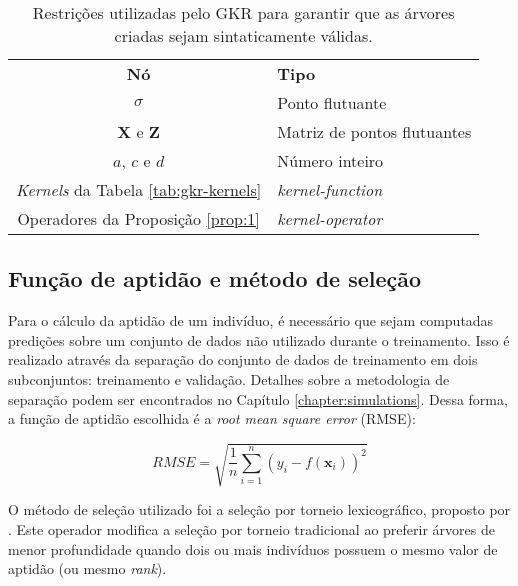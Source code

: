 \begin{table}[H]
    \caption{Restrições utilizadas pelo GKR para garantir que as árvores criadas sejam sintaticamente válidas.}
    \begin{center} \label{tab:stgp-constraints}
        \begin{tabular}{C@{\hskip 15pt}l}
            \hline\noalign{\smallskip}
            \textbf{Nó} & \textbf{Tipo} \\
            \noalign{\smallskip}
            \hline
            \noalign{\smallskip}
            $\sigma$ & Ponto flutuante \\
            $\mathbf{X}$ e $\mathbf{Z}$ & Matriz de pontos flutuantes \\
            $a$, $c$ e $d$ & Número inteiro \\
            \textit{Kernels} da Tabela \ref{tab:gkr-kernels} & \textit{kernel-function} \\
            Operadores da Proposição \ref{prop:1} & \textit{kernel-operator} \\
            \hline
        \end{tabular}
    \end{center}
    \begin{center}
    \end{center}
\end{table}

\subsection{Função de aptidão e método de seleção}
Para o cálculo da aptidão de um indivíduo, é necessário que sejam computadas predições sobre um conjunto de dados não utilizado durante o treinamento. Isso é realizado através da separação do conjunto de dados de treinamento em dois subconjuntos: treinamento e validação. Detalhes sobre a metodologia de separação podem ser encontrados no Capítulo \ref{chapter:simulations}. Dessa forma, a função de aptidão escolhida é a \textit{root mean square error} (RMSE):

\begin{equation}
    \label{ch3:eq29}
    RMSE = \sqrt{\frac{1}{n}\sum_{i=1}^{n}{(y_i - f(\mathbf{x}_i))^2}}
\end{equation}

O método de seleção utilizado foi a seleção por torneio lexicográfico, proposto por . Este operador modifica a seleção por torneio tradicional ao preferir árvores de menor profundidade quando dois ou mais indivíduos possuem o mesmo valor de aptidão (ou mesmo \textit{rank}).

